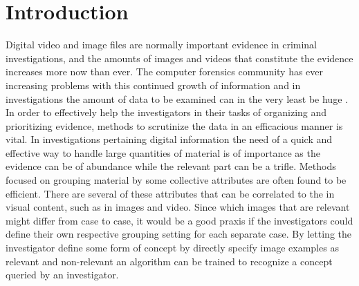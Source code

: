 \chapter{Introduction}
\label{chapter:intro}

Digital video and image files are normally important evidence in criminal investigations, and the amounts of images and videos that constitute the evidence increases more now than ever. The computer forensics community has ever increasing problems with this continued growth of information and in investigations the amount of data to be examined can in the very least be huge \cite{dhs2011}\cite{proc2009forensics}\cite{proc2010forensics}. In order to effectively help the investigators in their tasks of organizing and prioritizing evidence, methods to scrutinize the data in an efficacious manner is vital. In investigations pertaining digital information the need of a quick and effective way to handle large quantities of material is of importance as the evidence can be of abundance while the relevant part can be a trifle. Methods focused on grouping material by some collective attributes are often found to be efficient. There are several of these attributes that can be correlated to the  in visual content, such as in images and video. Since which images that are relevant might differ from case to case, it would be a good praxis if the investigators could define their own respective grouping setting for each separate case. By letting the investigator define some form of concept by directly specify image examples as relevant and non-relevant an algorithm can be trained to recognize a concept queried by an investigator.

